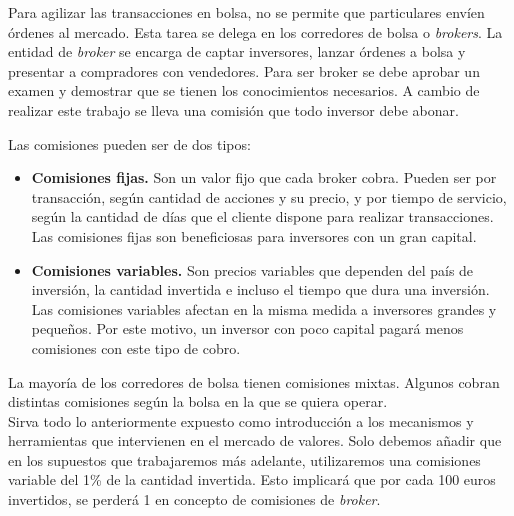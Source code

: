 		Para agilizar las transacciones en bolsa, no se permite que particulares env\'ien \'ordenes al mercado. Esta tarea se delega en los corredores de bolsa o \textit{brokers}. La entidad de \textit{broker} se encarga de captar inversores, lanzar \'ordenes a bolsa y presentar a compradores con vendedores. Para ser broker se debe aprobar un examen y demostrar que se tienen los conocimientos necesarios. A cambio de realizar este trabajo se lleva una comisi\'on que todo inversor debe abonar. 
		
		Las comisiones pueden ser de dos tipos:
		
		\begin{itemize}
			\item \textbf{Comisiones fijas.} Son un valor fijo que cada broker cobra. Pueden ser por transacci\'on, seg\'un cantidad de acciones y su precio, y por tiempo de servicio, seg\'un la cantidad de d\'ias que el cliente dispone para realizar transacciones. Las comisiones fijas son beneficiosas para inversores con un gran capital.
			
			\item \textbf{Comisiones variables.} Son precios variables que dependen del país de inversión, la cantidad invertida e incluso el tiempo que dura una inversi\'on. Las comisiones variables afectan en la misma medida a inversores grandes y peque\~nos. Por este motivo, un inversor con poco capital pagar\'a menos comisiones con este tipo de cobro.
		\end{itemize}
		
		La mayor\'ia de los corredores de bolsa tienen comisiones mixtas. Algunos cobran distintas comisiones seg\'un la bolsa en la que se quiera operar. \\
		
		Sirva todo lo anteriormente expuesto como introducci\'on a los mecanismos y herramientas que intervienen en el mercado de valores. Solo debemos a\~nadir que en los supuestos que trabajaremos m\'as adelante, utilizaremos una comisiones variable del 1\% de la cantidad invertida. Esto implicar\'a que por cada 100 euros invertidos, se perder\'a 1 en concepto de comisiones de \textit{broker}.
